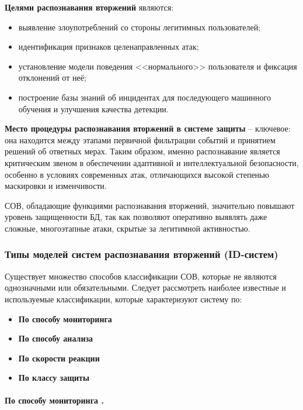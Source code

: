 \textbf{Целями распознавания вторжений} являются:
\begin{itemize}
    \item выявление злоупотреблений со стороны легитимных пользователей;
    \item идентификация признаков целенаправленных атак;
    \item установление модели поведения <<нормального>> пользователя и фиксация отклонений от неё;
    \item построение базы знаний об инцидентах для последующего машинного обучения и улучшения качества детекции.
\end{itemize}

\textbf{Место процедуры распознавания вторжений в системе защиты} -- ключевое: она находится между этапами первичной фильтрации событий и принятием решений об ответных мерах. Таким образом, именно распознавание является критическим звеном в обеспечении адаптивной и интеллектуальной безопасности, особенно в условиях современных атак, отличающихся высокой степенью маскировки и изменчивости.

СОВ, обладающие функциями распознавания вторжений, значительно повышают уровень защищенности БД, так как позволяют оперативно выявлять даже сложные, многоэтапные атаки, скрытые за легитимной активностью.

\subsubsection{Типы моделей систем распознавания вторжений (ID-систем)}

Существует множество способов классификации СОВ, которые не являются однозначными или
обязательными. Следует рассмотреть наиболее известные и используемые классификации,
которые характеризуют систему по:
\begin{itemize}
	\item \textbf{По способу мониторинга}

	\item \textbf{По способу анализа}

	\item \textbf{По скорости реакции}

	\item \textbf{По классу защиты}
\end{itemize}

\paragraph*{По способу мониторинга \cite{kasperskyIDS}.}

